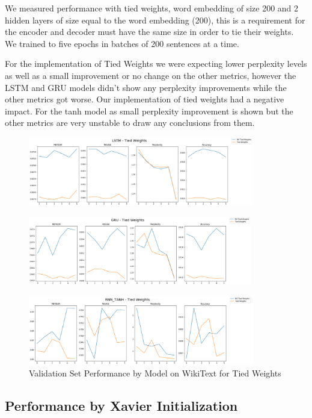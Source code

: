 \documentclass[a4paper]{article}
\begin{document}
We measured performance with tied weights, word embedding of size 200 and 2
hidden layers of size equal to the word embedding (200), this is a requirement
for the encoder and decoder must have the same size in order to tie their
weights. We trained to five epochs in batches of 200 sentences at a time.
 
For the implementation of Tied Weights we were expecting lower perplexity levels
as well as a small improvement or no change on the other metrics, however the
LSTM and GRU models didn't show any perplexity improvements while the other
metrics got worse. Our implementation of tied weights had a negative impact. For
the tanh model as small perplexity improvement is shown but the other metrics
are very unstable to draw any conclusions from them.

\begin{figure}[!ht]
\includegraphics[width=\textwidth, height=3cm]{lstm-tw}
\centering
\end{figure}
\begin{figure}[!ht]
\includegraphics[width=\textwidth, height=3cm]{gru-tw}
\centering
\end{figure}
\begin{figure}[!ht]
\includegraphics[width=\textwidth, height=3cm]{tanh-tw}
\centering
\caption{Validation Set Performance by Model on WikiText for Tied Weights}
\end{figure}


\subsection{Performance by Xavier Initialization}
\label{sec:perf_by_xavier_init}
\end{document}
